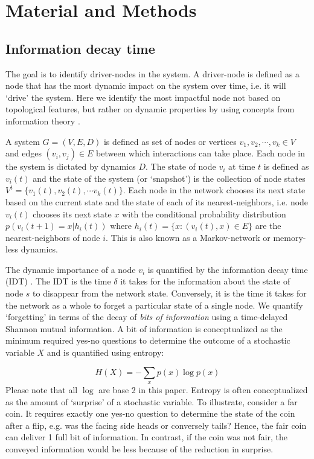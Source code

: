 \documentclass[twoside, twocolumn]{article}
\begin{document}
		

	\section{Material and Methods} \label{sec:methods}
	\subsection{Information decay time}

	The goal is to identify driver-nodes in the system. A driver-node is defined as a node that has the most dynamic impact on the system over time, i.e. it will `drive' the system. Here we identify the most impactful node  not based on topological features, but rather on dynamic properties by using concepts from information theory \cite{Quax2013}.


	A system $G = (V, E, D)$ is defined as set of nodes or vertices $v_1, v_2, \cdots, v_k \in V$ and edges $(v_i, v_j)\in E$ between which interactions can take place. Each node in the system is dictated by dynamics $D$. The state of node $v_i$ at time $t$ is defined as $v_i(t)$ and the state of the system (or `snapshot') is the collection of node states $V^t = \{v_1(t), v_2(t), \cdots v_k(t)\}$. Each node in the network chooses its next state based on the current state and the state of each of its nearest-neighbors, i.e. node $v_i(t)$ chooses its next state $x$ with the conditional probability distribution $p(v_i(t+1) = x \vert h_i(t))$ where $h_i(t) = \{x: (v_i(t), x) \in E\}$ are the nearest-neighbors of node $i$. This is also known as a Markov-network or memory-less dynamics.


	The dynamic importance of a node $v_i$ is quantified by the information decay time (IDT) \cite{Quax2013}. The IDT is the time $\delta$ it takes for the information about the state of node $s$ to disappear from the network state. Conversely, it is the time it takes for the network as a whole to forget a particular state of a single node. We quantify `forgetting' in terms of the decay of \textit{ bits of information} using a time-delayed Shannon mutual information. A bit of information is conceptualized as the minimum required yes-no questions to determine the outcome of a stochastic variable $X$ and is quantified using entropy\cite{Shannon1948}:

	\begin{equation}\label{entropy}
	H(X) = - \sum_x p(x) \log p(x)
	\end{equation}
	Please note that all $\log$ are base 2 in this paper.
	Entropy is often conceptualized as the amount of `surprise' of a stochastic variable. To illustrate, consider a far coin. It requires exactly one yes-no question to determine the state of the coin after a flip, e.g. was the facing side heads or conversely tails? Hence, the fair coin can deliver 1 full bit of information. In contrast, if the coin was not fair, the conveyed information would be less because of the reduction in surprise\cite{Cover2005}.
\end{document}
